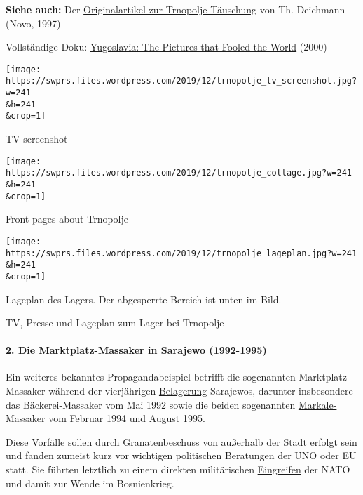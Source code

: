 \textbf{Siehe auch:} Der
\href{https://www.novo-argumente.com/artikel/es_war_dieses_bild_das_die_welt_in_alarmbereitschaft_versetzte_penny_marsha}{Originalartikel
zur Trnopolje-Täuschung} von Th. Deichmann (Novo, 1997)

Vollständige Doku:
\href{https://www.youtube.com/watch?v=xtQ-PJLIpcE}{Yugoslavia: The
Pictures that Fooled the World} (2000)

\href{https://swprs.files.wordpress.com/2019/12/trnopolje_tv_screenshot.jpg}{}

\texttt{[image: https://swprs.files.wordpress.com/2019/12/trnopolje\_tv\_screenshot.jpg?w=241\\\&h=241\\\&crop=1]}

TV screenshot

\href{https://swprs.files.wordpress.com/2019/12/trnopolje_collage.jpg}{}

\texttt{[image: https://swprs.files.wordpress.com/2019/12/trnopolje\_collage.jpg?w=241\\\&h=241\\\&crop=1]}

Front pages about Trnopolje

\href{https://swprs.files.wordpress.com/2019/12/trnopolje_lageplan.jpg}{}

\texttt{[image: https://swprs.files.wordpress.com/2019/12/trnopolje\_lageplan.jpg?w=241\\\&h=241\\\&crop=1]}

Lageplan des Lagers. Der abgesperrte Bereich ist unten im Bild.

TV, Presse und Lageplan zum Lager bei Trnopolje

\hypertarget{2-die-marktplatz-massaker-in-sarajewo-1992-1995}{%
\paragraph{2. Die Marktplatz-Massaker in Sarajewo
(1992-1995)}\label{2-die-marktplatz-massaker-in-sarajewo-1992-1995}}

Ein weiteres bekanntes Propaganda­beispiel betrifft die sogenannten
Marktplatz-Massaker während der vierjährigen
\href{https://en.wikipedia.org/wiki/Siege_of_Sarajevo}{Belagerung}
Sarajewos, darunter insbesondere das Bäckerei-Massaker vom Mai 1992
sowie die beiden sogenannten
\href{https://en.wikipedia.org/wiki/Markale_massacres}{Markale-Massaker}
vom Februar 1994 und August 1995.

Diese Vorfälle sollen durch Granatenbeschuss von außerhalb der Stadt
erfolgt sein und fanden zumeist kurz vor wichtigen politischen
Beratungen der UNO oder EU statt. Sie führten letztlich zu einem
direkten militärischen
\href{https://en.wikipedia.org/wiki/Operation_Deliberate_Force}{Eingreifen}
der NATO und damit zur Wende im Bosnienkrieg.

